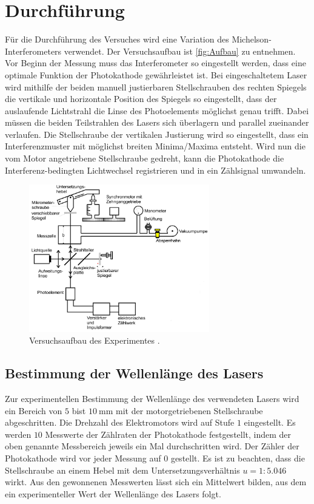 \section{Durchführung}
\label{sec:Durchführung}
Für die Durchführung des Versuches wird eine Variation des Michelson-Interferometers verwendet. Der Versuchsaufbau ist \autoref{fig:Aufbau} zu entnehmen.
Vor Beginn der Messung muss das Interferometer so eingestellt werden, dass eine optimale Funktion der Photokathode gewährleistet ist.
Bei eingeschaltetem Laser wird mithilfe der beiden manuell justierbaren Stellschrauben des rechten Spiegels die vertikale und horizontale
Position des Spiegels so eingestellt, dass der auslaufende Lichtstrahl die Linse des Photoelements möglichst genau trifft. Dabei müssen die beiden Teilstrahlen
des Lasers sich überlagern und parallel zueinander verlaufen. Die Stellschraube der vertikalen Justierung wird so eingestellt, dass ein Interferenzmuster
mit möglichst breiten Minima/Maxima entsteht. Wird nun die vom Motor angetriebene Stellschraube gedreht, kann die Photokathode die Interferenz-bedingten
Lichtwechsel registrieren und in ein Zählsignal umwandeln.

\begin{figure}
    \centering
    \includegraphics[width = 0.7\textwidth]{content/Aufbau.png}
    \caption{Versuchsaufbau des Experimentes \cite{v401}.}
    \label{fig:Aufbau}
\end{figure}

\subsection{Bestimmung der Wellenlänge des Lasers}
\label{subsec:Laser_Wellenlaenge}
Zur experimentellen Bestimmung der Wellenlänge des verwendeten Lasers wird ein Bereich von $5$ bist $\qty{10}{\milli\metre}$ mit der motorgetriebenen Stellschraube 
abgeschritten. Die Drehzahl des Elektromotors wird auf Stufe $1$ eingestellt. Es werden $10$ Messwerte der Zählraten der Photokathode festgestellt, indem
der oben genannte Messbereich jeweils ein Mal durchschritten wird. Der Zähler der Photokathode wird vor jeder Messung auf $0$ gestellt.
Es ist zu beachten, dass die Stellschraube an einem Hebel mit dem Untersetzungsverhältnis $u = 1:5.046$ wirkt. 
Aus den gewonnenen Messwerten lässt sich ein Mittelwert bilden, aus dem ein experimenteller Wert der Wellenlänge des Lasers folgt.

